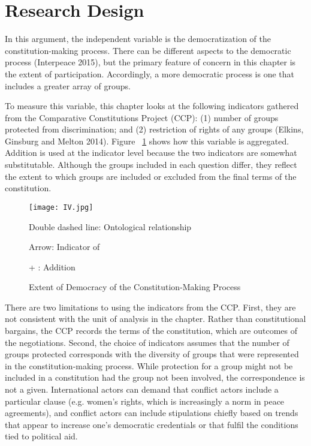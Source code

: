 \documentclass [11pt]{article}
\begin{document}
\section*{Research Design} %

In this argument, the independent variable is the democratization of the constitution-making process. There can be different aspects to the democratic process (Interpeace 2015), but the primary feature of concern in this chapter is the extent of participation. Accordingly, a more democratic process is one that includes a greater array of groups.

To measure this variable, this chapter looks at the following indicators gathered from the Comparative Constitutions Project (CCP): (1) number of groups protected from discrimination; and (2) restriction of rights of any groups (Elkins, Ginsburg and Melton 2014). Figure ~\ref{fig1} shows how this variable is aggregated. Addition is used at the indicator level because the two indicators are somewhat substitutable. Although the groups included in each question differ, they reflect the extent to which groups are included or excluded from the final terms of the constitution.

\begin{figure} [h!]

\caption{Extent of Democracy of the Constitution-Making Process}
\label{fig1}%
\begin{center} 
\small
\texttt{[image: IV.jpg]}

{\footnotesize Double dashed line: Ontological relationship}

{\footnotesize Arrow: Indicator of}

{\footnotesize + : Addition}
 
\end{center}
\end{figure}

There are two limitations to using the indicators from the CCP. First, they are not consistent with the unit of analysis in the chapter. Rather than constitutional bargains, the CCP records the terms of the constitution, which are outcomes of the negotiations. Second, the choice of indicators assumes that the number of groups protected corresponds with the diversity of groups that were represented in the constitution-making process. While protection for a group might not be included in a constitution had the group not been involved, the correspondence is not a given. International actors can demand that conflict actors include a particular clause (e.g. women's rights, which is increasingly a norm in peace agreements), and conflict actors can include stipulations chiefly based on trends that appear to increase one's democratic credentials or that fulfil the conditions tied to political aid.
\end{document}
